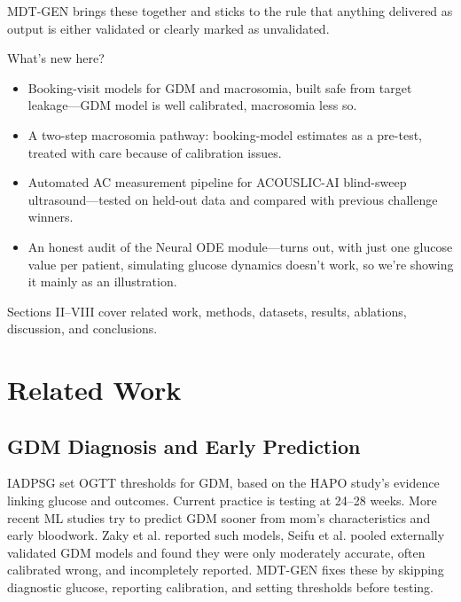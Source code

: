 \documentclass[conference]{IEEEtran}
\begin{document}
MDT-GEN brings these together and sticks to the rule that anything delivered as output is either validated or clearly marked as unvalidated.



What's new here?



\begin{itemize}

\item Booking-visit models for GDM and macrosomia, built safe from target leakage---GDM model is well calibrated, macrosomia less so.

\item A two-step macrosomia pathway: booking-model estimates as a pre-test, treated with care because of calibration issues.

\item Automated AC measurement pipeline for ACOUSLIC-AI blind-sweep ultrasound---tested on held-out data and compared with previous challenge winners.

\item An honest audit of the Neural ODE module---turns out, with just one glucose value per patient, simulating glucose dynamics doesn't work, so we're showing it mainly as an illustration.

\end{itemize}

Sections II--VIII cover related work, methods, datasets, results, ablations, discussion, and conclusions.



\section{Related Work}

\subsection{GDM Diagnosis and Early Prediction}

IADPSG set OGTT thresholds for GDM, based on the HAPO study's evidence linking glucose and outcomes. Current practice is testing at 24--28 weeks. More recent ML studies try to predict GDM sooner from mom's characteristics and early bloodwork. Zaky et al. reported such models, Seifu et al. pooled externally validated GDM models and found they were only moderately accurate, often calibrated wrong, and incompletely reported. MDT-GEN fixes these by skipping diagnostic glucose, reporting calibration, and setting thresholds before testing.
\end{document}
